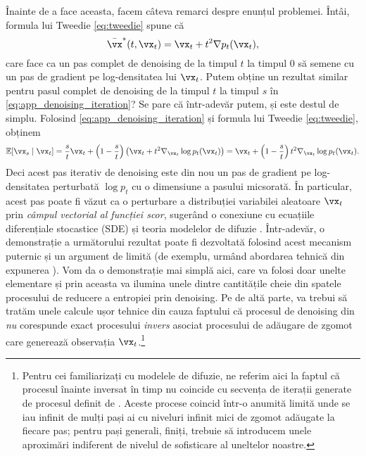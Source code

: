 \documentclass[../../book-main_ro.tex]{subfiles}
\begin{document}
Înainte de a face aceasta, facem câteva remarci despre enunțul problemei. Întâi, formula lui Tweedie \eqref{eq:tweedie} spune că 
\begin{equation}
    \bar{\vx}^{\ast}(t, \vx_{t}) = \vx_{t} + t^{2}\nabla p_{t}(\vx_{t}),
\end{equation}
care face ca un pas complet de denoising de la timpul \(t\) la timpul \(0\) să semene cu un pas de gradient pe log-densitatea lui \(\vx_{t}\). Putem obține un rezultat similar pentru pasul complet de denoising de la timpul \(t\) la timpul \(s\) în \eqref{eq:app_denoising_iteration}? Se pare că într-adevăr putem, și este destul de simplu. Folosind \eqref{eq:app_denoising_iteration} și formula lui Tweedie \eqref{eq:tweedie}, obținem
\begin{equation}\label{eq:app_denoising_iteration_score}
    \Ex[\vx_{s} \mid \vx_{t}] = \frac{s}{t}\vx_{t} + \bp{1 - \frac{s}{t}}\bp{\vx_{t} + t^{2}\nabla_{\vx_{t}}\log p_{t}(\vx_{t})} = \vx_{t} + \bp{1 - \frac{s}{t}}t^{2}\nabla_{\vx_{t}}\log p_{t}(\vx_{t}).
\end{equation}
Deci acest pas iterativ de denoising este din nou un pas de gradient pe log-densitatea perturbată \(\log p_{t}\) cu o dimensiune a pasului micsorată. În particular, acest pas poate fi văzut ca o perturbare a distribuției variabilei aleatoare \(\vx_{t}\) prin \textit{câmpul vectorial al funcției scor}, sugerând o conexiune cu ecuațiile diferențiale stocastice (SDE) și teoria modelelor de difuzie \cite{song2020score}. Într-adevăr, o demonstrație a următorului rezultat  poate fi dezvoltată folosind acest mecanism puternic și un argument de limită (de exemplu, urmând abordarea tehnică din expunerea \cite{DBLP:conf/iclr/ChenC0LSZ23}). Vom da o demonstrație mai simplă aici, care va folosi doar unelte elementare și prin aceasta va ilumina unele dintre cantitățile cheie din spatele procesului de reducere a entropiei prin denoising. Pe de altă parte, va trebui să tratăm unele calcule ușor tehnice din cauza faptului că procesul de denoising din  \textit{nu} corespunde exact procesului \textit{invers} asociat procesului de adăugare de zgomot care generează observația \(\vx_{t}\).\footnote{Pentru cei familiarizați cu modelele de difuzie, ne referim aici la faptul că procesul înainte inversat în timp nu coincide cu secvența de iterații generate de procesul definit de . Aceste procese coincid într-o anumită limită unde se iau infinit de mulți pași ai  cu niveluri infinit mici de zgomot adăugate la fiecare pas; pentru pași generali, finiți, trebuie să introducem unele aproximări indiferent de nivelul de sofisticare al uneltelor noastre.}
\end{document}
